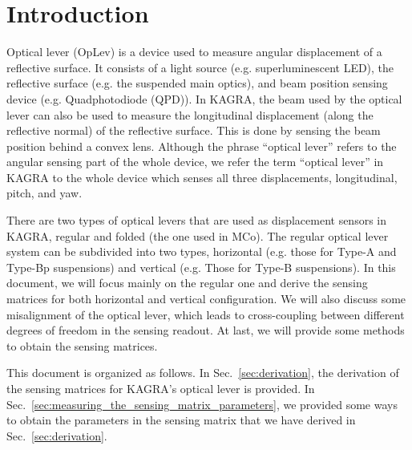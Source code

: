 \section{Introduction}
Optical lever (OpLev) is a device used to measure angular displacement of a reflective surface.
It consists of a light source (e.g. superluminescent LED), the reflective surface (e.g. the suspended main optics), and beam position sensing device (e.g. Quadphotodiode (QPD)).
In KAGRA, the beam used by the optical lever can also be used to measure the longitudinal displacement (along the reflective normal) of the reflective surface.
This is done by sensing the beam position behind a convex lens.
Although the phrase ``optical lever'' refers to the angular sensing part of the whole device, we refer the term ``optical lever'' in KAGRA to the whole device which senses all three displacements, longitudinal, pitch, and yaw.

There are two types of optical levers that are used as displacement sensors in KAGRA, regular and folded (the one used in MCo).
The regular optical lever system can be subdivided into two types, horizontal (e.g. those for Type-A and Type-Bp suspensions) and vertical (e.g. Those for Type-B suspensions).
In this document, we will focus mainly on the regular one and derive the sensing matrices for both horizontal and vertical configuration.
We will also discuss some misalignment of the optical lever, which leads to cross-coupling between different degrees of freedom in the sensing readout.
At last, we will provide some methods to obtain the sensing matrices.

This document is organized as follows.
In Sec.~\ref{sec:derivation}, the derivation of the sensing matrices for KAGRA's optical lever is provided.
In Sec.~\ref{sec:measuring_the_sensing_matrix_parameters}, we provided some ways to obtain the parameters in the sensing matrix that we have derived in Sec.~\ref{sec:derivation}.
